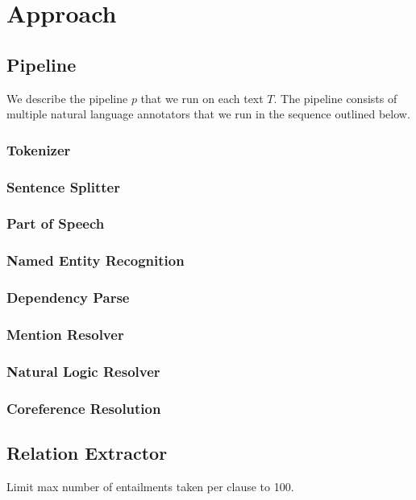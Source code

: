 \section{Approach}

\subsection{Pipeline}
We describe the pipeline $p$ that we run on each text $T$. The pipeline
consists of multiple natural language annotators that we run in 
the sequence outlined below.
\citep{manning2014stanford}
\subsubsection{Tokenizer}
\subsubsection{Sentence Splitter}
\subsubsection{Part of Speech}
\citet{toutanova2003tagger}
\subsubsection{Named Entity Recognition}
\citet{finkel2005incorporating}
\subsubsection{Dependency Parse}
\citet{chen2014nndep}
\subsubsection{Mention Resolver}

\subsubsection{Natural Logic Resolver}
\subsubsection{Coreference Resolution}
\citet{clark2015coref}

\subsection{Relation Extractor}
Limit max number of entailments taken per clause to 100.
\citet{angeli2015openie}
\citet{fader11reverb}
